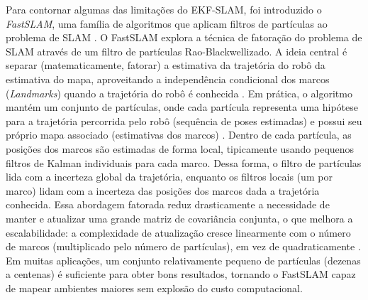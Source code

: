         Para contornar algumas das limitações do EKF-SLAM, foi introduzido o \textit{FastSLAM}, uma família de algoritmos que aplicam filtros de partículas ao problema de SLAM \cite{Montemerlo2002} \cite{Thrun2005}. O FastSLAM explora a técnica de fatoração do problema de SLAM através de um filtro de partículas Rao-Blackwellizado. A ideia central é separar (matematicamente, fatorar) a estimativa da trajetória do robô da estimativa do mapa, aproveitando a independência condicional dos marcos (\textit{Landmarks}) quando a trajetória do robô é conhecida \cite{Montemerlo2002}. Em prática, o algoritmo mantém um conjunto de partículas, onde cada partícula representa uma hipótese para a trajetória percorrida pelo robô (sequência de poses estimadas) e possui seu próprio mapa associado (estimativas dos marcos) \cite{Thrun2005}. Dentro de cada partícula, as posições dos marcos são estimadas de forma local, tipicamente usando pequenos filtros de Kalman individuais para cada marco. Dessa forma, o filtro de partículas lida com a incerteza global da trajetória, enquanto os filtros locais (um por marco) lidam com a incerteza das posições dos marcos dada a trajetória conhecida. Essa abordagem fatorada reduz drasticamente a necessidade de manter e atualizar uma grande matriz de covariância conjunta, o que melhora a escalabilidade: a complexidade de atualização cresce linearmente com o número de marcos (multiplicado pelo número de partículas), em vez de quadraticamente \cite{Thrun2005}. Em muitas aplicações, um conjunto relativamente pequeno de partículas (dezenas a centenas) é suficiente para obter bons resultados, tornando o FastSLAM capaz de mapear ambientes maiores sem explosão do custo computacional. 
        
